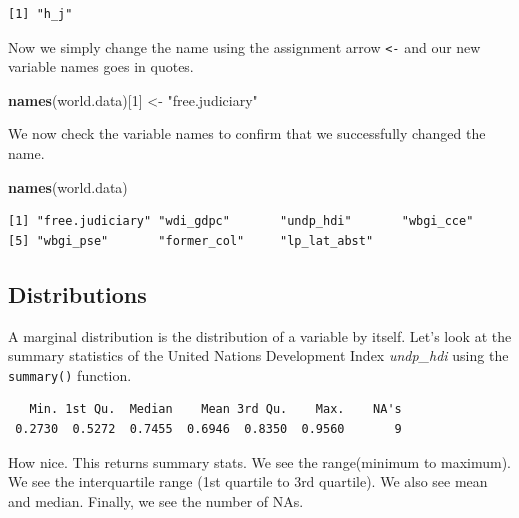 \documentclass[]{book}
\newenvironment{Shaded}{\begin{snugshade}}{\end{snugshade}}
\newcommand{\KeywordTok}[1]{\textcolor[rgb]{0.13,0.29,0.53}{\textbf{#1}}}
\newcommand{\DecValTok}[1]{\textcolor[rgb]{0.00,0.00,0.81}{#1}}
\newcommand{\StringTok}[1]{\textcolor[rgb]{0.31,0.60,0.02}{#1}}
\newcommand{\OperatorTok}[1]{\textcolor[rgb]{0.81,0.36,0.00}{\textbf{#1}}}
\newcommand{\NormalTok}[1]{#1}
\theoremstyle{definition}
\theoremstyle{definition}
\theoremstyle{definition}
\theoremstyle{remark}
\begin{document}
\begin{verbatim}
[1] "h_j"
\end{verbatim}

Now we simply change the name using the assignment arrow
\texttt{\textless{}-} and our new variable names goes in quotes.

\begin{Shaded}
\begin{Highlighting}[]
\KeywordTok{names}\NormalTok{(world.data)[}\DecValTok{1}\NormalTok{] <-}\StringTok{ "free.judiciary"}
\end{Highlighting}
\end{Shaded}

We now check the variable names to confirm that we successfully changed
the name.

\begin{Shaded}
\begin{Highlighting}[]
\KeywordTok{names}\NormalTok{(world.data)}
\end{Highlighting}
\end{Shaded}

\begin{verbatim}
[1] "free.judiciary" "wdi_gdpc"       "undp_hdi"       "wbgi_cce"      
[5] "wbgi_pse"       "former_col"     "lp_lat_abst"   
\end{verbatim}

\subsection{Distributions}\label{distributions}

A marginal distribution is the distribution of a variable by itself.
Let's look at the summary statistics of the United Nations Development
Index \emph{undp\_hdi} using the \texttt{summary()} function.

\begin{Shaded}
\end{Shaded}

\begin{verbatim}
   Min. 1st Qu.  Median    Mean 3rd Qu.    Max.    NA's 
 0.2730  0.5272  0.7455  0.6946  0.8350  0.9560       9 
\end{verbatim}

How nice. This returns summary stats. We see the range(minimum to
maximum). We see the interquartile range (1st quartile to 3rd quartile).
We also see mean and median. Finally, we see the number of NAs.
\end{document}
